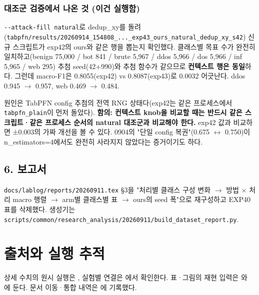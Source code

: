\subsubsection{대조군 검증에서 나온 것 (이건 실행함)}
\texttt{-\allowbreak{}-\allowbreak{}attack\allowbreak{}-\allowbreak{}fill na\allowbreak{}tural}로 dedup\_\allowbreak{}xy를 돌려(\texttt{tabpfn/\allowbreak{}\allowbreak{}r\allowbreak{}esults/\allowbreak{}\allowbreak{}2\allowbreak{}0260914\_\allowbreak{}\allowbreak{}154808\_\allowbreak{}\allowbreak{}.\allowbreak{}.\allowbreak{}.\allowbreak{}\_\allowbreak{}\allowbreak{}exp43\allowbreak{}\_\allowbreak{}\allowbreak{}ours\_\allowbreak{}\allowbreak{}na\allowbreak{}tural\_\allowbreak{}\allowbreak{}de\allowbreak{}dup\_\allowbreak{}\allowbreak{}xy\_\allowbreak{}\allowbreak{}s\allowbreak{}42}) 신규 스크립트가 exp42의 ours와 같은 행을 뽑는지 확인했다. 클래스별 목표 수가 완전히 일치하고(benign 75,000 /\allowbreak{} bot 841 /\allowbreak{} brute 5,967 /\allowbreak{} ddos 5,966 /\allowbreak{} dos 5,966 /\allowbreak{} inf 5,965 /\allowbreak{} web 295) 추첨 seed(42+\allowbreak{}990)와 추첨 함수가 같으므로 \textbf{컨텍스트 행은 동일}하다. 그런데 macro-F1은 0.8055(exp42) vs 0.8087(exp43)로 0.0032 어긋난다. ddos 0.945  \ensuremath{\rightarrow}  0.957, web 0.469  \ensuremath{\rightarrow}  0.484.

원인은 TabPFN config 추첨의 전역 RNG 상태다(exp42는 같은 프로세스에서 \texttt{tabpfn\_\allowbreak{}\allowbreak{}p\allowbreak{}lain}이 먼저 돌았다). \textbf{함의: 컨텍스트 knob을 비교할 때는 반드시 같은 스크립트·같은 프로세스 순서의 natural 대조군과 비교해야 한다.} exp42 값과 비교하면 ±0.003의 가짜 개선을 볼 수 있다. 0904의 "단일 config 복권"(0.675 \ensuremath{\leftrightarrow} 0.750)이 n\_\allowbreak{}estimators=\allowbreak{}4에서도 완전히 사라지지 않았다는 증거이기도 하다.

\subsection{6. 보고서}
\texttt{docs/\allowbreak{}\allowbreak{}lab\allowbreak{}log/\allowbreak{}\allowbreak{}repo\allowbreak{}rts/\allowbreak{}\allowbreak{}2026\allowbreak{}0911.\allowbreak{}tex\allowbreak{}} §3을 "처리별 클래스 구성 변화  \ensuremath{\rightarrow}  방법 × 처리 macro 행렬  \ensuremath{\rightarrow}  arm별 클래스별 표  \ensuremath{\rightarrow}  ours의 seed 폭"으로 재구성하고 EXP40 표를 삭제했다. 생성기는 \texttt{scripts/\allowbreak{}\allowbreak{}common/\allowbreak{}\allowbreak{}r\allowbreak{}esearch\_\allowbreak{}\allowbreak{}analysis\allowbreak{}/\allowbreak{}\allowbreak{}2026091\allowbreak{}1/\allowbreak{}\allowbreak{}build\_\allowbreak{}\allowbreak{}dataset\_\allowbreak{}\allowbreak{}report.\allowbreak{}p\allowbreak{}y}.



\section*{출처와 실행 추적}

상세 수치의 원시 실행은 , 실험별 연결은 에서 확인한다. 표·그림의 재현 입력은 와 에 둔다. 문서 이동·통합 내역은 에 기록했다.


